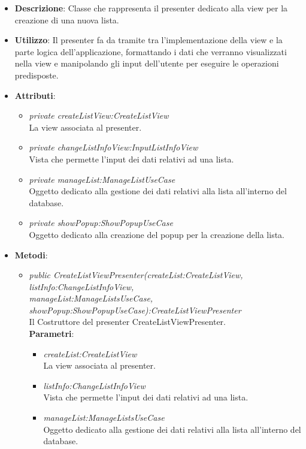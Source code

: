 \begin{itemize}
\item \textbf{Descrizione}: Classe che rappresenta il presenter dedicato alla view per la creazione di una nuova lista.
\item \textbf{Utilizzo}: Il presenter fa da tramite tra l'implementazione della view e la parte logica dell'applicazione, formattando i dati che verranno visualizzati nella view e manipolando gli input dell'utente per eseguire le operazioni predisposte.
\item \textbf{Attributi}: 
	\begin{itemize}
	\item \textit{private createListView:CreateListView}\\
	La view associata al presenter.
	\item \textit{private changeListInfoView:InputListInfoView}\\
	Vista che permette l'input dei dati relativi ad una lista.
	\item \textit{private manageList:ManageListUseCase}\\
	Oggetto dedicato alla gestione dei dati relativi alla lista all'interno del database.
	\item \textit{private showPopup:ShowPopupUseCase}\\
	Oggetto dedicato alla creazione del popup per la creazione della lista.
	\end{itemize}
\item \textbf{Metodi}:
	\begin{itemize}
	\item \textit{public CreateListViewPresenter(createList:CreateListView, listInfo:ChangeListInfoView, \\ manageList:ManageListsUseCase, showPopup:ShowPopupUseCase):CreateListViewPresenter}\\
		Il Costruttore del presenter CreateListViewPresenter.
		\\ \textbf{Parametri}: \begin{itemize}
		\item \textit{createList:CreateListView}\\
			La view associata al presenter.
		\item \textit{listInfo:ChangeListInfoView}\\
			Vista che permette l'input dei dati relativi ad una lista.
		\item \textit{manageList:ManageListsUseCase}\\
			Oggetto dedicato alla gestione dei dati relativi alla lista all'interno del database.

\end{itemize}
\end{itemize}
\end{itemize}
